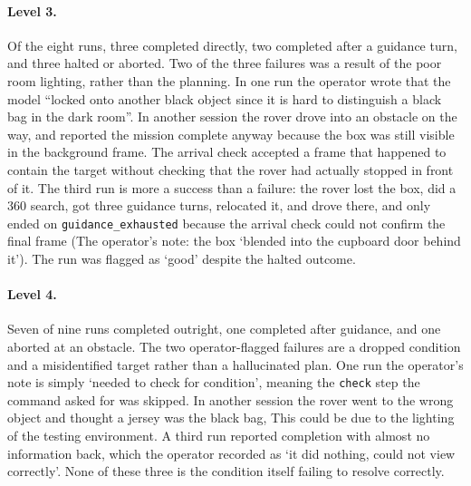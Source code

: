 \paragraph{Level 3.} Of the eight runs, three completed directly, two completed after a guidance turn, and three
halted or aborted. Two of the three failures was a result of the poor room lighting, rather than the planning. 
In one run the operator wrote that the model ``locked onto another black
object since it is hard to distinguish a black bag in the dark room''. In another session the rover drove into an obstacle on the way, 
and reported the mission complete anyway because the box was still visible
in the background frame. The arrival check accepted a frame that happened to contain the target without checking
that the rover had actually stopped in front of it. The third run is more a success than a
failure: the rover lost the box, did a 360\textdegree{} search, got three guidance turns, relocated it, and drove
there, and only ended on \texttt{guidance\_exhausted} because the arrival check could not confirm the final frame
(The operator's note: the box `blended into the cupboard door behind it'). The run was flagged as `good' despite
the halted outcome. 

\paragraph{Level 4.} Seven of nine runs completed outright, one completed after guidance, and one aborted at an
obstacle. The two operator-flagged failures are a dropped condition and a misidentified target rather than a
hallucinated plan. One run the operator's note is simply `needed to check for condition', meaning
the \texttt{check} step the command asked for was skipped. In another session the rover went to the wrong
object and thought a jersey was the black bag, This could be due to the lighting of the 
testing environment. A third run reported completion
with almost no information back, which the operator recorded as `it did nothing, could not view correctly'. None
of these three is the condition itself failing to resolve correctly.

